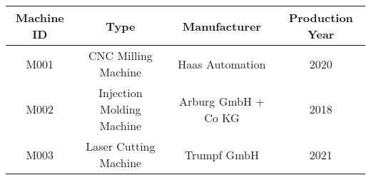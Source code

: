 \begin{tabular}{|c|c|c|c|}
\hline
Machine ID & Type & Manufacturer & Production Year \\
\hline
M001 & CNC Milling Machine & Haas Automation & 2020 \\
\hline
M002 & Injection Molding Machine & Arburg GmbH + Co KG & 2018 \\
\hline
M003 & Laser Cutting Machine & Trumpf GmbH & 2021 \\
\hline
\end{tabular}
